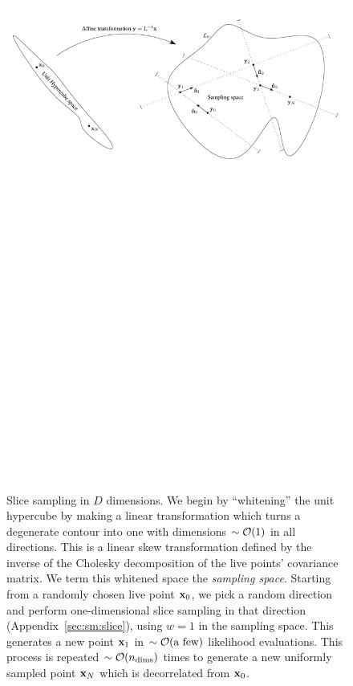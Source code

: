%
\begin{figure}[tp]
  \centerline{%
    \includegraphics[width=\textwidth]{chapter_polychord/figures/contour}
}
\caption{%
  Slice sampling in $D$ dimensions. 
  We begin by ``whitening'' the unit hypercube by making a linear transformation which turns a degenerate contour into one with dimensions ${\sim\mathcal{O}{\left(1\right)}}$ in all directions. 
  This is a linear skew transformation defined by the inverse of the Cholesky decomposition of the live points' covariance matrix. 
  We term this whitened space the {\em sampling space}. 
  Starting from a randomly chosen live point $\mathbf{x}_{0}$, we pick a random direction and perform one-dimensional slice sampling in that direction (Appendix~\protect\ref{sec:sm:slice}), using $w=1$ in the sampling space. 
  This generates a new point $\mathbf{x}_{1}$ in ${\sim\mathcal{O}{\left(\text{a few}\right)}}$ likelihood evaluations. 
  This process is repeated ${\sim\mathcal{O}{\left(n_{\mathrm{dims}}\right)}}$ times to generate a new uniformly sampled point $\mathbf{x}_{N}$ which is decorrelated from $\mathbf{x}_{0}$.\label{fig:pc:Nd_slice}
}
\end{figure}
%

